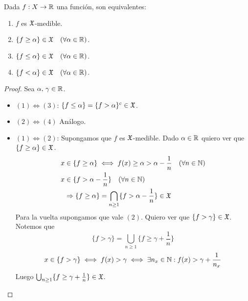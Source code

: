 \begin{lemma}
    Dada \(f: X \to \mathbb{R}\) una función, son equivalentes:
    \begin{enumerate}
        \item \(f\) es \(\mathfrak{X}\)-medible.
        \item \(\{ f \geq \alpha \} \in \mathfrak{X} \quad (\forall \alpha \in \mathbb{R})\).
        \item \(\{ f \leq \alpha \} \in \mathfrak{X} \quad (\forall \alpha \in \mathbb{R})\).
        \item \(\{ f < \alpha \} \in \mathfrak{X} \quad (\forall \alpha \in \mathbb{R})\).
    \end{enumerate}

    \begin{proof}
        Sea \(\alpha \text{, } \gamma \in \mathbb{R}\).
        \begin{itemize}
            \item \((1) \iff (3)\): \(\{ f \leq \alpha \} = \{ f > \alpha \}^c \in \mathfrak{X}\).
            \item \((2) \iff (4)\) Análogo.
            \item \((1) \iff (2)\): Supongamos que \(f\) es \(\mathfrak{X}\)-medible. Dado \(\alpha \in \mathbb{R}\) quiero ver que \(\{ f \geq \alpha \} \in \mathfrak{X}\).
                  \begin{align*}
                      x & \in \{ f \geq \alpha \} \iff f(x) \geq \alpha > \alpha - \frac{1}{n} \quad (\forall n \in \mathbb{N})  \\
                      x & \in \{ f > \alpha - \frac{1}{n} \} \quad (\forall n \in \mathbb{N})                                    \\
                        & \Rightarrow \{ f \geq \alpha \} = \bigcap_{n \geq 1} \{ f > \alpha - \frac{1}{n} \} \in \mathfrak{X}
                  \end{align*}
                  Para la vuelta supongamos que vale \((2)\). Quiero ver que \(\{ f > \gamma \} \in \mathfrak{X}\). Notemos que
                  \begin{equation*}
                      \{ f > \gamma \} = \bigcup_{n \geq 1} \{ f \geq \gamma + \frac{1}{n} \}
                  \end{equation*}
                  \begin{equation*}
                      x \in \{ f > \gamma \} \iff f(x) > \gamma \iff \exists n_x \in \mathbb{N} : f(x) > \gamma + \frac{1}{n_x}
                  \end{equation*}
                  Luego \(\bigcup_{n \geq 1} \{ f \geq \gamma + \frac{1}{n} \} \in \mathfrak{X}\).
        \end{itemize}
    \end{proof}
\end{lemma}

